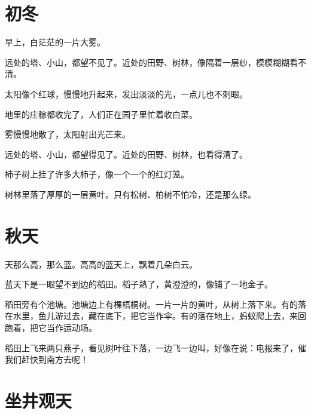 \documentclass[12pt,UTF-8,openany]{ctexbook}
\begin{document}
\chapter{初冬}

\begin{large}
    
    早上，白茫茫的一片大雾。
    
    远处的塔、小山，都望不见了。近处的田野、树林，像隔着一层纱，模模糊糊看不清。
    
    太阳像个红球，慢慢地升起来，发出淡淡的光，一点儿也不刺眼。
    
    地里的庄稼都收完了，人们正在园子里忙着收白菜。
    
    雾慢慢地散了，太阳射出光芒来。
    
    远处的塔、小山，都望得见了。近处的田野、树林，也看得清了。
    
    柿子树上挂了许多大柿子，像一个一个的红灯笼。
    
    树林里落了厚厚的一层黄叶。只有松树、柏树不怕冷，还是那么绿。
    
\end{large}



\chapter{秋天}

\begin{large}
    
    天那么高，那么蓝。高高的蓝天上，飘着几朵白云。
    
    蓝天下是一眼望不到边的稻田。稻子熟了，黄澄澄的，像铺了一地金子。
    
    稻田旁有个池塘。池塘边上有棵梧桐树。一片一片的黄叶，从树上落下来。有的落在水里，鱼儿游过去，藏在底下，把它当作伞。有的落在地上，蚂蚁爬上去，来回跑着，把它当作运动场。
    
    稻田上飞来两只燕子，看见树叶往下落，一边飞一边叫，好像在说：电报来了，催我们赶快到南方去呢！
    
\end{large}



\chapter{坐井观天}
\end{document}
